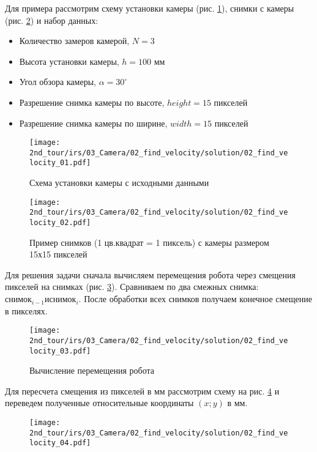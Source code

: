 \solutionSection

Для примера рассмотрим схему установки камеры (рис. \ref{fig:02_find_velocity_01}), снимки с камеры (рис. \ref{fig:02_find_velocity_02}) и набор данных:
\begin{itemize}
	\item Количество замеров камерой, $N = 3$
	\item Высота установки камеры, $h = 100$ мм
	\item Угол обзора камеры, $\alpha = 30^\circ$
	\item Разрешение снимка камеры по высоте, $height = 15$ пикселей
	\item Разрешение снимка камеры по ширине, $width = 15$ пикселей
\end{itemize}

\begin{figure}[H]
	\centering
	\texttt{[image: 2nd\_tour/irs/03\_Camera/02\_find\_velocity/solution/02\_find\_velocity\_01.pdf]}
	\caption{Схема установки камеры с исходными данными}
	\label{fig:02_find_velocity_01}
\end{figure}

\begin{figure}[H]
	\centering
	\texttt{[image: 2nd\_tour/irs/03\_Camera/02\_find\_velocity/solution/02\_find\_velocity\_02.pdf]}
	\caption{Пример снимков (1 цв.квадрат = 1 пиксель) с камеры размером 15х15 пикселей}
	\label{fig:02_find_velocity_02}
\end{figure}

Для решения задачи сначала вычисляем перемещения робота через смещения пикселей на снимках (рис. \ref{fig:02_find_velocity_03}). Сравниваем по два смежных снимка: $снимок_{i-1} и снимок_i$. После обработки всех снимков получаем конечное смещение в пикселях.

\begin{figure}[H]
	\centering
	\texttt{[image: 2nd\_tour/irs/03\_Camera/02\_find\_velocity/solution/02\_find\_velocity\_03.pdf]}
	\caption{Вычисление перемещения робота}
	\label{fig:02_find_velocity_03}
\end{figure}

\newpage

Для пересчета смещения из пикселей в мм рассмотрим схему на рис. \ref{fig:02_find_velocity_04} и переведем полученные относительные координаты $(x; y)$ в мм.

\begin{figure}[H]
	\center
	\texttt{[image: 2nd\_tour/irs/03\_Camera/02\_find\_velocity/solution/02\_find\_velocity\_04.pdf]}
	\caption{}
	\label{fig:02_find_velocity_04}
\end{figure}


